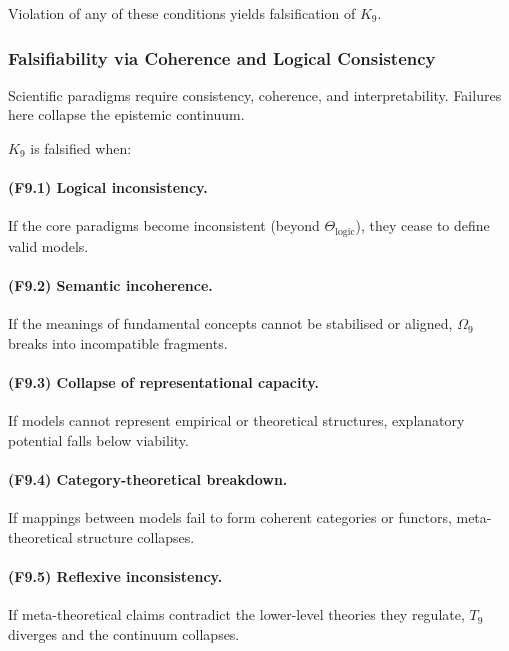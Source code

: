 Violation of any of these conditions yields falsification of $K_9$.



\subsubsection{Falsifiability via Coherence and Logical Consistency}

Scientific paradigms require consistency, coherence, and interpretability.
Failures here collapse the epistemic continuum.

$K_9$ is falsified when:

\paragraph{(F9.1) Logical inconsistency.}
If the core paradigms become inconsistent
(beyond $\Theta_{\mathrm{logic}}$),
they cease to define valid models.

\paragraph{(F9.2) Semantic incoherence.}
If the meanings of fundamental concepts
cannot be stabilised or aligned,
$\Omega_9$ breaks into incompatible fragments.

\paragraph{(F9.3) Collapse of representational capacity.}
If models cannot represent empirical or theoretical structures,
explanatory potential falls below viability.

\paragraph{(F9.4) Category-theoretical breakdown.}
If mappings between models fail to form coherent categories or functors,
meta-theoretical structure collapses.

\paragraph{(F9.5) Reflexive inconsistency.}
If meta-theoretical claims contradict the lower-level theories they regulate,
$T_9$ diverges and the continuum collapses.



